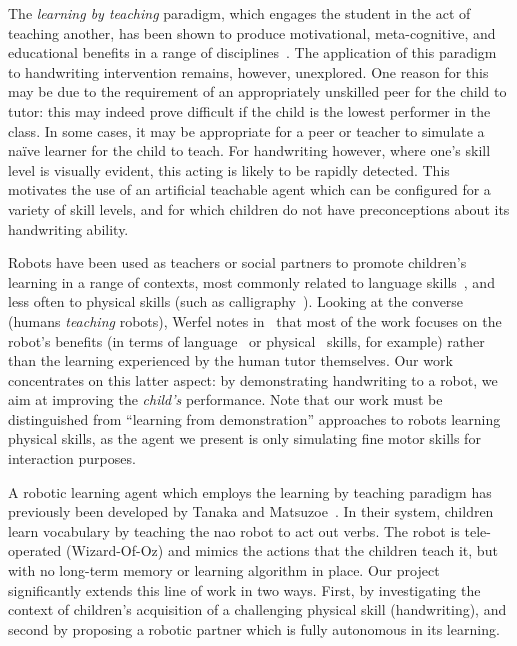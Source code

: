\documentclass{article}
\begin{document}
The \emph{learning by teaching} paradigm, which engages the student in the act
of teaching another, has been shown to produce motivational, meta-cognitive, and
educational benefits in a range of disciplines~\cite{Rohrbeck2003}. The
application of this paradigm to handwriting intervention remains, however,
unexplored. One reason for this may be due to the requirement of an
appropriately unskilled peer for the child to tutor: this may indeed prove
difficult if the child is the lowest performer in the class.  In some cases, it
may be appropriate for a peer or teacher to simulate a na\"ive learner for the
child to teach. For handwriting however, where one's skill level is visually
evident, this acting is likely to be rapidly detected. This motivates the use of
an artificial teachable agent which can be configured for a variety of skill
levels, and for which children do not have preconceptions about its handwriting
ability.

Robots have been used as teachers or social partners to promote children's
learning in a range of contexts, most commonly related to language
skills~\cite{han2010robot}, and less often to physical skills (such as
calligraphy~\cite{Matsui2013}). Looking at the converse (humans \emph{teaching}
robots), Werfel notes in~\cite{Werfel2014} that most of the work focuses on the
robot's benefits (in terms of language~\cite{Saunders2010} or
physical~\cite{Mulling2013} skills, for example) rather than the learning
experienced by the human tutor themselves.  Our work concentrates on this latter
aspect: by demonstrating handwriting to a robot, we aim at improving the
\emph{child's} performance. Note that our work must be distinguished from
``learning from demonstration'' approaches to robots learning physical skills,
as the agent we present is only simulating fine motor skills for interaction
purposes.

A robotic learning agent which employs the learning by teaching paradigm has
previously been developed by Tanaka and Matsuzoe~\cite{Tanaka2012}. In their
system, children learn vocabulary by teaching the {\sc nao} robot to act out
verbs. The robot is tele-operated (Wizard-Of-Oz) and mimics the actions that the
children teach it, but with no long-term memory or learning algorithm in place.
Our project significantly extends this line of work in two ways. First, by
investigating the context of children's acquisition of a challenging physical
skill (handwriting), and second by proposing a robotic partner which is fully
autonomous in its learning.
\end{document}
